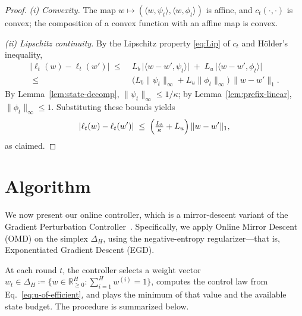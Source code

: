 \documentclass[11pt]{article}
\begin{document}
\begin{proof}
\emph{(i) Convexity.}
The map \(w \mapsto (\langle w,\psi_t\rangle,\langle w,\phi_t\rangle)\) is affine, and \(c_t(\cdot,\cdot)\) is convex; the composition of a convex function with an affine map is convex.

\emph{(ii) Lipschitz continuity.}
By the Lipschitz property \eqref{eq:Lip} of \(c_t\) and Hölder’s inequality,
\begin{align*}
|\ell_t(w)-\ell_t(w')|
\;\le\;&
L_b\,\big|\langle w-w',\psi_t\rangle\big|
\;+\;
L_u\,\big|\langle w-w',\phi_t\rangle\big|
\\\;\le\;&
\bigl(L_b\|\psi_t\|_\infty + L_u\|\phi_t\|_\infty\bigr)\,\|w-w'\|_1.
\end{align*}
By Lemma~\ref{lem:state-decomp}, \(\|\psi_t\|_\infty \le 1/\kappa\); by Lemma~\ref{lem:prefix-linear}, \(\|\phi_t\|_\infty \le 1\). Substituting these bounds yields
\[
|\ell_t(w)-\ell_t(w')|
\;\le\;
\Bigl(\tfrac{L_b}{\kappa} + L_u\Bigr)\,\|w-w'\|_1,
\]
as claimed.
\end{proof}


\section{Algorithm}

We now present our online controller, which is a mirror-descent variant of the Gradient Perturbation Controller~\cite{hazan_introduction_2025}.  
Specifically, we apply Online Mirror Descent (OMD) on the simplex \(\Delta_H\), using the negative-entropy regularizer—that is, Exponentiated Gradient Descent (EGD).

At each round \(t\), the controller selects a weight vector \(w_t \in \Delta_H \coloneqq \{w \in \mathbb{R}^H_{\ge 0} : \sum_{i=1}^H w^{(i)}=1\}\), computes the control law from Eq.~\eqref{eq:u-of-efficient}, and plays the minimum of that value and the available state budget.
The procedure is summarized below.
\end{document}

